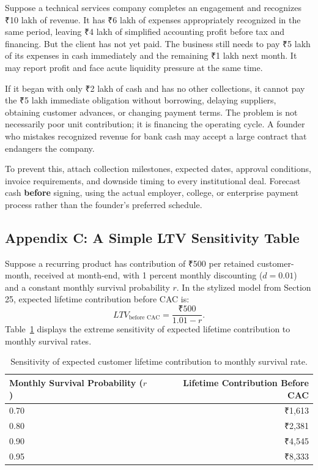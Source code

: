 Suppose a technical services company completes an engagement and recognizes ₹10 lakh of revenue. It has ₹6 lakh of expenses appropriately recognized in the same period, leaving ₹4 lakh of simplified accounting profit before tax and financing. But the client has not yet paid. The business still needs to pay ₹5 lakh of its expenses in cash immediately and the remaining ₹1 lakh next month. It may report profit and face acute liquidity pressure at the same time.

If it began with only ₹2 lakh of cash and has no other collections, it cannot pay the ₹5 lakh immediate obligation without borrowing, delaying suppliers, obtaining customer advances, or changing payment terms. The problem is not necessarily poor unit contribution; it is financing the operating cycle. A founder who mistakes recognized revenue for bank cash may accept a large contract that endangers the company.

To prevent this, attach collection milestones, expected dates, approval conditions, invoice requirements, and downside timing to every institutional deal. Forecast cash \textbf{before} signing, using the actual employer, college, or enterprise payment process rather than the founder's preferred schedule.

\subsection*{Appendix C: A Simple LTV Sensitivity Table}

Suppose a recurring product has contribution of ₹500 per retained customer-month, received at month-end, with 1 percent monthly discounting ($d = 0.01$) and a constant monthly survival probability $r$. In the stylized model from Section 25, expected lifetime contribution before CAC is:
\begin{equation}
LTV_{\text{before CAC}} = \frac{₹500}{1.01 - r}.
\end{equation}
Table~\ref{tab:ltv-sensitivity} displays the extreme sensitivity of expected lifetime contribution to monthly survival rates.

\begin{table}[htbp]
\centering
\small
\begin{tabularx}{\columnwidth}{Xr}
\toprule
\textbf{Monthly Survival Probability ($r$)} & \textbf{Lifetime Contribution Before CAC} \\
\midrule
0.70 & ₹1,613 \\
0.80 & ₹2,381 \\
0.90 & ₹4,545 \\
0.95 & ₹8,333 \\
\bottomrule
\end{tabularx}
\caption{Sensitivity of expected customer lifetime contribution to monthly survival rate.}
\label{tab:ltv-sensitivity}
\end{table}

